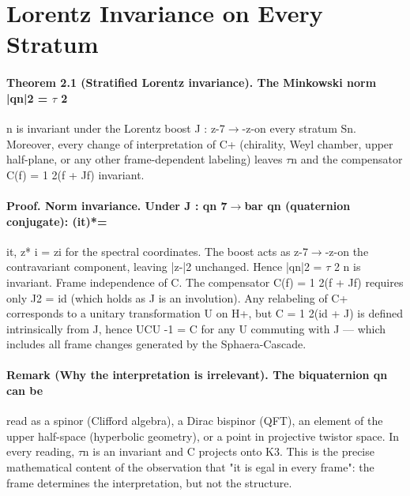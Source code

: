\section{Lorentz Invariance on Every Stratum}
\paragraph*{Theorem 2.1 (Stratified Lorentz invariance). The Minkowski norm |qn|2 = $\tau$ 2}
n is invariant under the Lorentz boost J : z-7$\to$-z-on every stratum Sn. Moreover, every change of interpretation of C+ (chirality, Weyl chamber, upper half-plane, or any other frame-dependent labeling) leaves $\tau$n and the compensator C(f) = 1 2(f + Jf) invariant.
\paragraph*{Proof. Norm invariance. Under J : qn 7$\to$bar qn (quaternion conjugate): (it)*=}
it, z* i = zi for the spectral coordinates. The boost acts as z-7$\to$-z-on the contravariant component, leaving |z-|2 unchanged. Hence |qn|2 = $\tau$ 2 n is invariant. Frame independence of C. The compensator C(f) = 1 2(f + Jf) requires only J2 = id (which holds as J is an involution). Any relabeling of C+ corresponds to a unitary transformation U on H+, but C = 1 2(id + J) is defined intrinsically from J, hence UCU -1 = C for any U commuting with J --- which includes all frame changes generated by the Sphaera-Cascade.
\paragraph*{Remark (Why the interpretation is irrelevant). The biquaternion qn can be}
read as a spinor (Clifford algebra), a Dirac bispinor (QFT), an element of the upper half-space (hyperbolic geometry), or a point in projective twistor space. In every reading, $\tau$n is an invariant and C projects onto K3. This is the precise mathematical content of the observation that "it is egal in every frame": the frame determines the interpretation, but not the structure.

